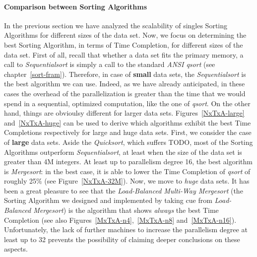 \paragraph{Comparison between Sorting Algorithms}
In the previous section we have analyzed the scalability of singles Sorting Algorithms for different sizes of the data set. Now, we focus on determining the best Sorting Algorithm, in terms of Time Completion, for different sizes of the data set. First of all, recall that whether a data set fits the primary memory, a call to \textit{Sequentialsort} is simply a call to the standard \textit{ANSI qsort} (see chapter~\ref{sort-fram}). Therefore, in case of \textbf{small} data sets, the \textit{Sequentialsort} is the best algorithm we can use. Indeed, as we have already anticipated, in these cases the overhead of the parallelization is greater than the time that we would spend in a sequential, optimized computation, like the one of \textit{qsort}. On the other hand, things are obvioulsy different for larger data sets. Figures~\ref{NxTxA-large} and~\ref{NxTxA-huge} can be used to derive which algorithms exhibit the best Time Completions respectively for large and huge data sets. First, we consider the case of \textbf{large} data sets. 
Aside the \textit{Quicksort}, which suffers TODO, most of the Sorting Algorithms outperform \textit{Sequentialsort}, at least when the size of the data set is greater than 4M integers. At least up to parallelism degree 16, the best algorithm is \textit{Mergesort}: in the best case, it is able to lower the Time Completion of \textit{qsort} of roughly 25$\%$ (see Figure~\ref{NxTxA-32M}). Now, we move to \textit{huge} data sets. It has been a great pleasure to see that the \textit{Load-Balanced Multi-Way Mergesort} (the Sorting Algorithm we designed and implemented by taking cue from \textit{Load-Balanced Mergesort}) is the algorithm that shows \textit{always} the best Time Completion (see also Figures~\ref{MxTxA-n4},~\ref{MxTxA-n8} and~\ref{MxTxA-n16}). Unfortunately, the lack of further machines to increase the parallelism degree at least up to 32 prevents the possibility of claiming deeper conclusions on these aspects. 


